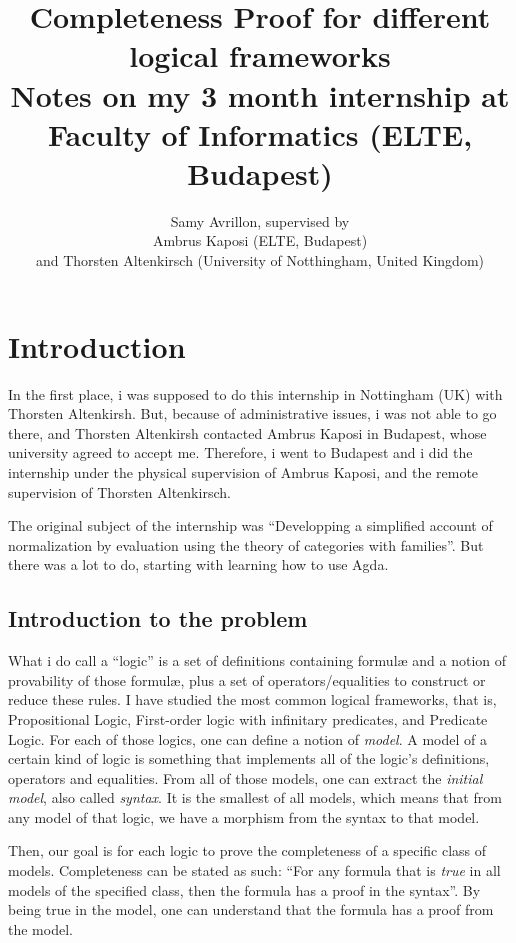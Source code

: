 \documentclass[10pt,a4paper]{article}
\title{Completeness Proof for different logical frameworks
	\\[1ex] \large Notes on my 3 month internship at Faculty of Informatics (ELTE, Budapest)}
\author{Samy Avrillon, supervised by
	\\[1ex] Ambrus Kaposi (ELTE, Budapest)
	\\[1ex] and Thorsten Altenkirsch (University of Notthingham, United Kingdom)}
\begin{document}
	
	\doparttoc
	\maketitle
	
	\hsep
	
	\tableofcontents
	
	\newpage
	
	
	\section{Introduction}
	
		In the first place, i was supposed to do this internship in Nottingham (UK) with Thorsten Altenkirsh. But, because of administrative issues, i was not able to go there, and Thorsten Altenkirsh contacted Ambrus Kaposi in Budapest, whose university agreed to accept me. Therefore, i went to Budapest and i did the internship under the physical supervision of Ambrus Kaposi, and the remote supervision of Thorsten Altenkirsch.
		
		The original subject of the internship was \enquote{Developping a simplified account of normalization by evaluation using the theory of categories with families}. But there was a lot to do, starting with learning how to use Agda.
		
		\subsection{Introduction to the problem}
			What i do call a \enquote{logic} is a set of definitions containing formulæ and a notion of provability of those formulæ, plus a set of operators/equalities to construct or reduce these rules. I have studied the most common logical frameworks, that is, Propositional Logic, First-order logic with infinitary predicates, and Predicate Logic. For each of those logics, one can define a notion of \emph{model}. A model of a certain kind of logic is something that implements all of the logic's definitions, operators and equalities. From all of those models, one can extract the \emph{initial model}, also called \emph{syntax}. It is the smallest of all models, which means that from any model of that logic, we have a morphism from the syntax to that model.
			
			Then, our goal is for each logic to prove the completeness of a specific class of models. Completeness can be stated as such: \enquote{For any formula that is \emph{true} in all models of the specified class, then the formula has a proof in the syntax}. By being true in the model, one can understand that the formula has a proof from the model.
\end{document}
